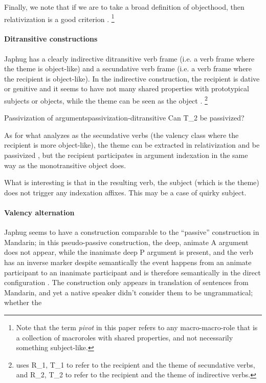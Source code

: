\documentclass[a4paper, oneside, 12pt]{report}
\newcommand*{\citesec}[1]{\S~{#1}}
\newcommand*{\citepage}[1]{p.~{#1}}
\newcommand*{\citepages}[1]{pp.~{#1}}
\newcommand*{\term}[1]{\emph{#1}}
\begin{document}
Finally, we note that if we are to take a broad definition of objecthood,
then relativization is a good criterion 
\citep{jacques2016subjects}.%
\footnote{
    Note that the term \term{pivot} in this paper refers to 
    any macro-macro-role that is a collection of macroroles with shared properties,
    and not necessarily something subject-like.
}

\paragraph*{Ditransitive constructions}
Japhug has a clearly indirective ditransitive verb frame
(i.e. a verb frame where the theme is object-like)
and a secundative verb frame  
(i.e. a verb frame where the recipient is object-like).
In the indirective construction,
the recipient is dative or genitive \citep[\citesec{14.4.1}]{jacques2021grammar}
and it seems to have not many shared properties with prototypical subjects or objects,
while the theme can be seen as the object \citep{jacques2016subjects}.%
\footnote{
    \citet{jacques2016subjects} 
    uses R_1, T_1 to refer to the recipient and the theme of secundative verbs,
    and R_2, T_2 to refer to the recipient and the theme of indirective verbs. 
}

\begin{todobox}{Passivization of arguments}{passivization-ditransitive}
    Can T_2 be passivized?
\end{todobox}

As for what \citet[\citesec{14.4.2}]{jacques2021grammar} analyzes as 
the secundative verbs (the valency class where the recipient is more object-like),
the theme can be extracted in relativization \citep[\citepages{581}]{jacques2021grammar}
and be passivized \citep[\citesec{18.1.4}]{jacques2021grammar},
but the recipient participates in argument indexation
in the same way as the monotransitive object does.

What is interesting is that in the resulting verb,
the subject (which is the theme) does not trigger any indexation affixes.
This may be a case of quirky subject.

\paragraph*{Valency alternation} 
Japhug seems to have a construction comparable to
the ``passive'' construction in Mandarin;
in this pseudo-passive construction,
the deep, animate A argument does not appear, 
while the inanimate deep P argument is present, 
and the verb has an inverse marker 
despite semantically the event happens 
from an animate participant to an inanimate participant
and is therefore semantically in the direct configuration
\citep[\citepage{575}]{jacques2021grammar}.
The construction only appears in translation of sentences from Mandarin,
and yet a native speaker didn't consider them to be ungrammatical;
whether the 
\end{document}
